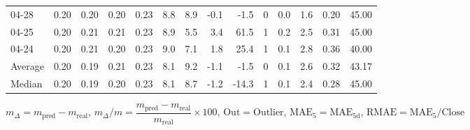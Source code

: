 \begin{threeparttable}
{\begin{tabular}{lrrrrrrrrrrrrr}
  04-28 &          0.20 &          0.20 &          0.20 &        0.23 &                 8.8 &                 8.9 &       -0.1 &         -1.5 &              0 &                 0.0 &              1.6 &            0.20 &                  45.00 \\
  04-25 &          0.20 &          0.21 &          0.21 &        0.23 &                 8.9 &                 5.5 &        3.4 &         61.5 &              1 &                 0.2 &              2.5 &            0.31 &                  45.00 \\
  04-24 &          0.20 &          0.21 &          0.20 &        0.23 &                 9.0 &                 7.1 &        1.8 &         25.4 &              1 &                 0.1 &              2.8 &            0.36 &                  40.00 \\
Average &          0.20 &          0.19 &          0.21 &        0.23 &                 8.1 &                 9.2 &       -1.1 &         -1.5 &              0 &                 0.1 &              2.6 &            0.32 &                  43.17 \\
 Median &          0.20 &          0.19 &          0.20 &        0.23 &                 8.1 &                 8.7 &       -1.2 &        -14.3 &              1 &                 0.1 &              2.4 &            0.28 &                  45.00 \\
\bottomrule
\end{tabular}
}
\begin{tablenotes}\footnotesize
\item $m_\Delta=m_{\text{pred}}-m_{\text{real}}$,
$m_\Delta/m=\dfrac{m_{\text{pred}}-m_{\text{real}}}{m_{\text{real}}}\times100$,
$\mathrm{Out}=\text{Outlier}$,
$\mathrm{MAE}_5=\mathrm{MAE}_{5\text{d}}$,
$\mathrm{RMAE}=\mathrm{MAE}_5/\text{Close}$
\end{tablenotes}
\end{threeparttable}
\endgroup

